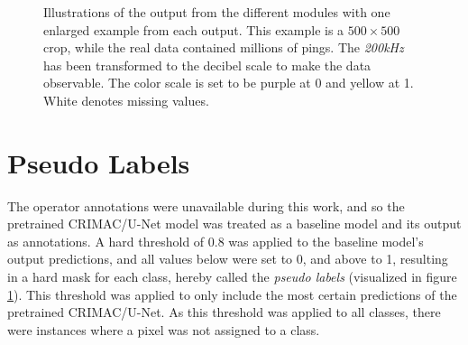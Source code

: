         
        \begin{figure}[H]
            \centering
            
            \caption[Module outputs illustration]{Illustrations of the output from the different modules with one enlarged example from each output. This example is a $500\times500$ crop, while the real data contained millions of pings. The \textit{200kHz} has been transformed to the decibel scale to make the data observable. The color scale is set to be purple at 0 and yellow at 1. White denotes missing values.}
          	\medskip 
            \label{Module_outputs_illustration_fig}
        \end{figure}

    \section{Pseudo Labels} \label{Pseudo label}
        The operator annotations were unavailable during this work, and so the pretrained CRIMAC/U-Net model was treated as a baseline model and its output as annotations. A hard threshold of 0.8 was applied to the baseline model’s output predictions, and all values below were set to 0, and above to 1, resulting in a hard mask for each class, hereby called the \textit{pseudo labels} (visualized in figure \ref{Pseudo label}). This threshold was applied to only include the most certain predictions of the pretrained CRIMAC/U-Net. As this threshold was applied to all classes, there were instances where a pixel was not assigned to a class.
        
        
